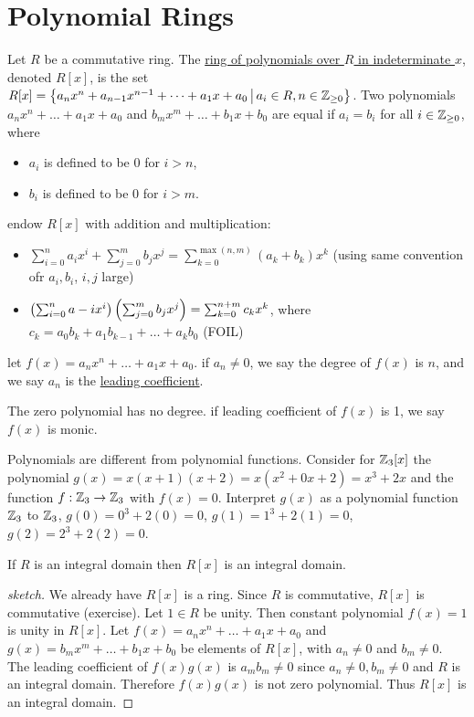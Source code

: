 \documentclass[]{article}
\begin{document}
\section{Polynomial Rings}
Let $R$ be a commutative ring. The \ul{ring of polynomials over $R$ in indeterminate $x$}, denoted $R[x]$, is the set
$R[x] = \left\{ a_nx^n+a_{n-1}x^{n-1}+\dots+a_1x+a_0 \, \middle| \, a_i\in R,n\in\mathbb{Z}_{\geq0} \right\}$.
Two polynomials $a_nx^n+\dots+a_1x+a_0$ and $b_mx^m+\dots+b_1x+b_0$ are equal if $a_i=b_i$ for all $i\in\mathbb{Z}_{\geq0}$, where
\begin{itemize}
	\item $a_i$ is defined to be 0 for $i>n$,
	\item $b_i$ is defined to be 0 for $i>m$.
\end{itemize}
endow $R[x]$ with addition and multiplication:
\begin{itemize}
	\item $\sum_{i=0}^n a_ix^i+\sum_{j=0}^m b_jx^j = \sum_{k=0}^{\max(n,m)} (a_k+b_k)x^k$ (using same convention ofr $a_i,b_i$, $i,j$ large)
	\item $\left(\sum_{i=0}^na-ix^i\right)\left(\sum_{j=0}^mb_jx^j\right) = \sum_{k=0}^{n+m}c_kx^k$, where $c_k = a_0b_k+a_1b_{k-1}+\dots+a_kb_0$ (FOIL)
\end{itemize}
let $f(x)=a_nx^n+\dots+a_1x+a_0$. if $a_n\neq0$, we say the degree of $f(x)$ is $n$, and we say $a_n$ is the \ul{leading coefficient}.
\begin{note}
	The zero polynomial has no degree. if leading coefficient of $f(x)$ is 1, we say $f(x)$ is monic.
\end{note}
\begin{example}
	Polynomials are different from polynomial functions.
	Consider for $\mathbb{Z}_3[x]$ the polynomial $g(x)=x(x+1)(x+2)=x(x^2+0x+2)=x^3+2x$ and the function $f:\mathbb{Z}_3\rightarrow\mathbb{Z}_3$ with $f(x)=0$.
	Interpret $g(x)$ as a polynomial function $\mathbb{Z}_3$ to $\mathbb{Z}_3$, $g(0)=0^3+2(0)=0$, $g(1)=1^3+2(1)=0$, $g(2)=2^3+2(2)=0$.
\end{example}
\begin{theorem}
	If $R$ is an integral domain then $R[x]$ is an integral domain.
\end{theorem}
\begin{proof}
	[sketch] We already have $R[x]$ is a ring. Since $R$ is commutative, $R[x]$ is commutative (exercise).
	Let $1\in R$ be unity. Then constant polynomial $f(x)=1$ is unity in $R[x]$.
	Let $f(x)=a_nx^n+\dots+a_1x+a_0$ and $g(x)=b_mx^m+\dots+b_1x+b_0$ be elements of $R[x]$, with $a_n\neq0$ and $b_m\neq0$.
	The leading coefficient of $f(x)g(x)$ is $a_mb_m\neq0$ since $a_n\neq0,b_m\neq0$ and $R$ is an integral domain.
	Therefore $f(x)g(x)$ is not zero polynomial. Thus $R[x]$ is an integral domain.
\end{proof}
\end{document}
